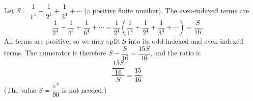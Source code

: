 Let $S=\dfrac{1}{1^4}+\dfrac{1}{2^4}+\dfrac{1}{3^4}+\cdots$ (a positive finite number). The even-indexed terms are
\[\dfrac{1}{2^4}+\dfrac{1}{4^4}+\dfrac{1}{6^4}+\cdots=\dfrac{1}{2^4}\left(\dfrac{1}{1^4}+\dfrac{1}{2^4}+\dfrac{1}{3^4}+\cdots\right)=\dfrac{S}{16}.\]
All terms are positive, so we may split $S$ into its odd-indexed and even-indexed terms. The numerator is therefore $S-\dfrac {S}{16}=\dfrac{15S}{16}$, and the ratio is
\[\dfrac{\dfrac{15S}{16}}{S}=\boxed{\dfrac{15}{16}}.\]
(The value $S=\dfrac{\pi^4}{90}$ is not needed.)
